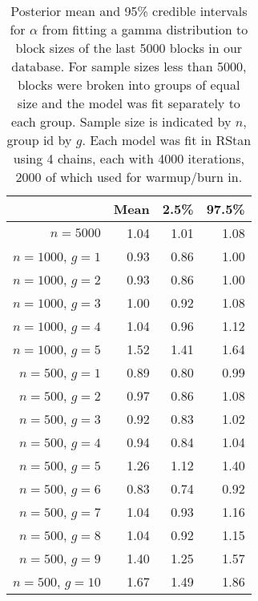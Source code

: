 \documentclass{article}
\begin{document}
\begin{table}[ht]
\centering
\begin{tabular}{rrrr}
  \hline
 & Mean & 2.5\% & 97.5\% \\ 
  \hline
  $n=5000$ & 1.04 & 1.01 & 1.08 \\ 
  $n=1000$, $g=1$ & 0.93 & 0.86 & 1.00 \\ 
  $n=1000$, $g=2$ & 0.93 & 0.86 & 1.00 \\ 
  $n=1000$, $g=3$ & 1.00 & 0.92 & 1.08 \\ 
  $n=1000$, $g=4$ & 1.04 & 0.96 & 1.12 \\ 
  $n=1000$, $g=5$ & 1.52 & 1.41 & 1.64 \\ 
  $n=500$, $g=1$ & 0.89 & 0.80 & 0.99 \\ 
  $n=500$, $g=2$ & 0.97 & 0.86 & 1.08 \\ 
  $n=500$, $g=3$ & 0.92 & 0.83 & 1.02 \\ 
  $n=500$, $g=4$ & 0.94 & 0.84 & 1.04 \\ 
  $n=500$, $g=5$ & 1.26 & 1.12 & 1.40 \\ 
  $n=500$, $g=6$ & 0.83 & 0.74 & 0.92 \\ 
  $n=500$, $g=7$ & 1.04 & 0.93 & 1.16 \\ 
  $n=500$, $g=8$ & 1.04 & 0.92 & 1.15 \\ 
  $n=500$, $g=9$ & 1.40 & 1.25 & 1.57 \\ 
  $n=500$, $g=10$ & 1.67 & 1.49 & 1.86 \\ 
   \hline
\end{tabular}
\caption{Posterior mean and 95\% credible intervals for $\alpha$ from fitting a gamma distribution to block sizes of the last 5000 blocks in our database. For sample sizes less than 5000, blocks were broken into groups of equal size and the model was fit separately to each group. Sample size is indicated by $n$, group id by $g$. Each model was fit in RStan \citep{rstan-software:2015,stan-software:2015} using 4 chains, each with 4000 iterations, 2000 of which used for warmup/burn in.}
\label{tab:gammafit}
\end{table}
\end{document}
